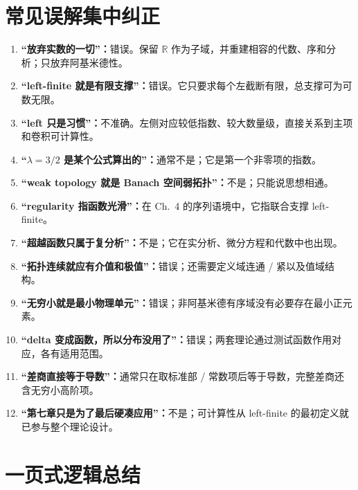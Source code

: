 \documentclass[11pt,a4paper]{article}
\theoremstyle{remark}
\newcommand{\R}{\mathbb R}
\begin{document}
\section{常见误解集中纠正}

\begin{enumerate}
\item \textbf{“放弃实数的一切”：}错误。保留 $\R$ 作为子域，并重建相容的代数、序和分析；只放弃阿基米德性。
\item \textbf{“left-finite 就是有限支撑”：}错误。它只要求每个左截断有限，总支撑可为可数无限。
\item \textbf{“left 只是习惯”：}不准确。左侧对应较低指数、较大数量级，直接关系到主项和卷积可计算性。
\item \textbf{“$\lambda=3/2$ 是某个公式算出的”：}通常不是；它是第一个非零项的指数。
\item \textbf{“weak topology 就是 Banach 空间弱拓扑”：}不是；只能说思想相通。
\item \textbf{“regularity 指函数光滑”：}在 Ch.~4 的序列语境中，它指联合支撑 left-finite。
\item \textbf{“超越函数只属于复分析”：}不是；它在实分析、微分方程和代数中也出现。
\item \textbf{“拓扑连续就应有介值和极值”：}错误；还需要定义域连通 / 紧以及值域结构。
\item \textbf{“无穷小就是最小物理单元”：}错误；非阿基米德有序域没有必要存在最小正元素。
\item \textbf{“delta 变成函数，所以分布没用了”：}错误；两套理论通过测试函数作用对应，各有适用范围。
\item \textbf{“差商直接等于导数”：}通常只在取标准部 / 常数项后等于导数，完整差商还含无穷小高阶项。
\item \textbf{“第七章只是为了最后硬凑应用”：}不是；可计算性从 left-finite 的最初定义就已参与整个理论设计。
\end{enumerate}

\section{一页式逻辑总结}
\end{document}
